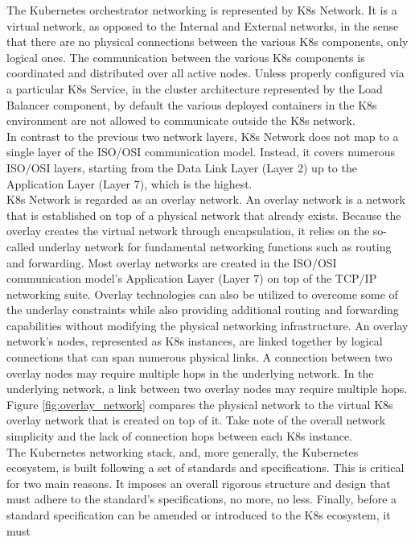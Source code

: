 The Kubernetes orchestrator networking is represented by K8s Network. It is a virtual
network, as opposed to the Internal and External networks, in the sense that there
are no physical connections between the various K8s components, only logical
ones. The communication between the various K8s components is coordinated and distributed
over all active nodes. Unless properly configured via a particular K8s Service, in
the cluster architecture represented by the Load Balancer component, by default
the various deployed containers in the K8s environment are not allowed to
communicate outside the K8s network. \\ %
In contrast to the previous two network layers, K8s Network does not map to a single
layer of the ISO/OSI communication model. Instead, it covers numerous ISO/OSI layers,
starting from the Data Link Layer (Layer 2) up to the Application Layer (Layer 7),
which is the highest. \\ %
K8s Network is regarded as an overlay network. An overlay network is a network
that is established on top of a physical network that already exists. Because the
overlay creates the virtual network through encapsulation, it relies on the so-called
underlay network for fundamental networking functions such as routing and
forwarding. Most overlay networks are created in the ISO/OSI communication model's
Application Layer (Layer 7) on top of the TCP/IP networking suite. Overlay
technologies can also be utilized to overcome some of the underlay constraints
while also providing additional routing and forwarding capabilities without
modifying the physical networking infrastructure. An overlay network's nodes,
represented as K8s instances, are linked together by logical connections that can
span numerous physical links. A connection between two overlay nodes may require
multiple hops in the underlying network. In the underlying network, a link
between two overlay nodes may require multiple hops. Figure \ref{fig:overlay_network}
compares the physical network to the virtual K8s overlay network that is created
on top of it. Take note of the overall network simplicity and the lack of
connection hops between each K8s instance. \\ %
The Kubernetes networking stack, and, more generally, the Kubernetes ecosystem,
is built following a set of standards and specifications. This is critical for two
main reasons. It imposes an overall rigorous structure and design that must
adhere to the standard's specifications, no more, no less. Finally, before a
standard specification can be amended or introduced to the K8s ecosystem, it must
